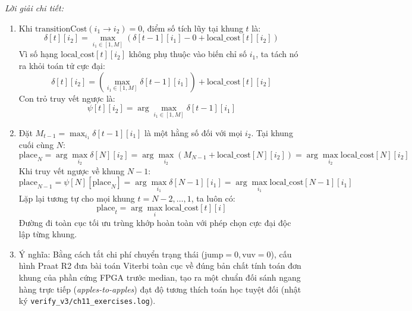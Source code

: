 \textit{Lời giải chi tiết:}
\begin{enumerate}[label=(\alph*)]
    \item Khi $\text{transitionCost}(i_1 \to i_2) = 0$, điểm số tích lũy tại khung $t$ là:
    \begin{equation*}
        \delta[t][i_2] = \max_{i_1 \in [1, M]} \left( \delta[t-1][i_1] - 0 + \text{local\_cost}[t][i_2] \right)
    \end{equation*}
    Vì số hạng $\text{local\_cost}[t][i_2]$ không phụ thuộc vào biến chỉ số $i_1$, ta tách nó ra khỏi toán tử cực đại:
    \begin{equation*}
        \delta[t][i_2] = \left( \max_{i_1 \in [1, M]} \delta[t-1][i_1] \right) + \text{local\_cost}[t][i_2]
    \end{equation*}
    Con trỏ truy vết ngược là:
    \begin{equation*}
        \psi[t][i_2] = \arg\max_{i_1 \in [1, M]} \delta[t-1][i_1]
    \end{equation*}
    \item Đặt $M_{t-1} = \max_{i_1} \delta[t-1][i_1]$ là một hằng số đối với mọi $i_2$.
    Tại khung cuối cùng $N$:
    \begin{equation*}
        \text{place}_N = \arg\max_{i_2} \delta[N][i_2] = \arg\max_{i_2} \left( M_{N-1} + \text{local\_cost}[N][i_2] \right) = \arg\max_{i_2} \text{local\_cost}[N][i_2]
    \end{equation*}
    Khi truy vết ngược về khung $N-1$:
    \begin{equation*}
        \text{place}_{N-1} = \psi[N][\text{place}_N] = \arg\max_{i_1} \delta[N-1][i_1] = \arg\max_{i_1} \text{local\_cost}[N-1][i_1]
    \end{equation*}
    Lặp lại tương tự cho mọi khung $t = N-2, \dots, 1$, ta luôn có:
    \begin{equation*}
        \text{place}_t = \arg\max_{i} \text{local\_cost}[t][i]
    \end{equation*}
    Đường đi toàn cục tối ưu trùng khớp hoàn toàn với phép chọn cực đại độc lập từng khung.
    \item Ý nghĩa: Bằng cách tắt chi phí chuyển trạng thái ($\text{jump} = 0, \text{vuv} = 0$), cấu hình Praat R2 đưa bài toán Viterbi toàn cục về đúng bản chất tính toán đơn khung của phần cứng FPGA trước median, tạo ra một chuẩn đối sánh ngang hàng trực tiếp (\emph{apples-to-apples}) đạt độ tương thích toán học tuyệt đối (nhật ký \texttt{verify\_v3/ch11\_exercises.log}).
\end{enumerate}

